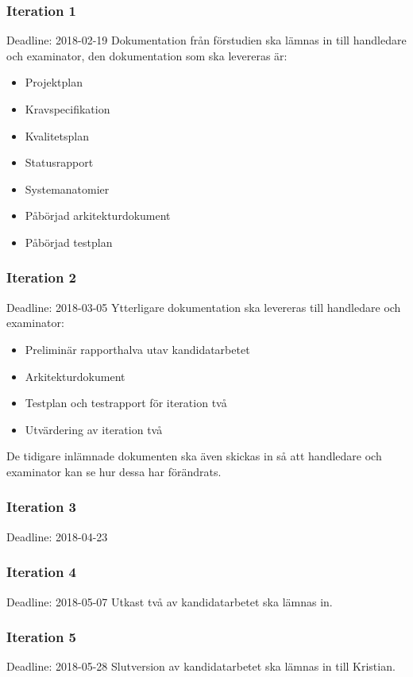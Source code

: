 \documentclass[a4paper,10pt]{article}
\begin{document}
\subsubsection{Iteration 1}
Deadline: 2018-02-19
Dokumentation från förstudien ska lämnas in till handledare och examinator, den dokumentation som ska levereras är:
\begin{itemize}
\item Projektplan
\item Kravspecifikation
\item Kvalitetsplan
\item Statusrapport
\item Systemanatomier
\item Påbörjad arkitekturdokument
\item Påbörjad testplan
\end{itemize}
\subsubsection{Iteration 2}
Deadline: 2018-03-05
Ytterligare dokumentation ska levereras till handledare och examinator:
\begin{itemize}
\item Preliminär rapporthalva utav kandidatarbetet
\item Arkitekturdokument
\item Testplan och testrapport för iteration två
\item Utvärdering av iteration två
\end{itemize}
De tidigare inlämnade dokumenten ska även skickas in så att handledare och examinator kan se hur dessa har förändrats.
\subsubsection{Iteration 3}
Deadline: 2018-04-23
\subsubsection{Iteration 4}
Deadline: 2018-05-07
Utkast två av kandidatarbetet ska lämnas in.
\subsubsection{Iteration 5}
Deadline: 2018-05-28
Slutversion av kandidatarbetet ska lämnas in till Kristian.
\end{document}
